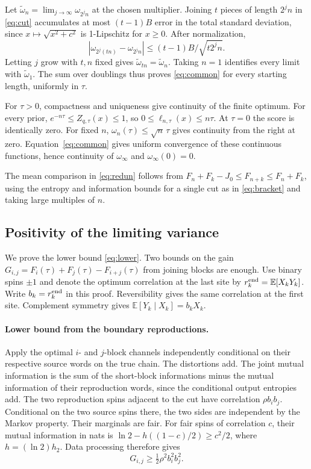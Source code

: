 \documentclass[11pt,letterpaper]{article}
\theoremstyle{definition}
\newcommand{\E}{\mathbb E}
\newcommand{\hx}{h_2}
\begin{document}
Let $\widetilde\omega_n=\lim_{j\to\infty}\omega_{2^jn}$ at the chosen multiplier. Joining $t$ pieces of length $2^jn$ in \eqref{eq:cut} accumulates at most $(t-1)B$ error in the total standard deviation, since $x\mapsto\sqrt{x^2+c^2}$ is 1-Lipschitz for $x\ge0$. After normalization,
\[
 |\omega_{2^j(tn)}-\omega_{2^jn}|\le (t-1)B/\sqrt{t2^jn}.
\]
Letting $j$ grow with $t,n$ fixed gives $\widetilde\omega_{tn}=\widetilde\omega_n$. Taking $n=1$ identifies every limit with $\widetilde\omega_1$. The sum over doublings thus proves \eqref{eq:common} for every starting length, uniformly in $\tau$.

For $\tau>0$, compactness and uniqueness give continuity of the finite optimum. For every prior, $e^{-n\tau}\le Z_{q,\tau}(x)\le1$, so $0\le\ell_{n,\tau}(x)\le n\tau$. At $\tau=0$ the score is identically zero. For fixed $n$, $\omega_n(\tau)\le\sqrt n\,\tau$ gives continuity from the right at zero. Equation~\eqref{eq:common} gives uniform convergence of these continuous functions, hence continuity of $\omega_\infty$ and $\omega_\infty(0)=0$.

The mean comparison in \eqref{eq:redun} follows from $F_n+F_k-J_0\le F_{n+k}\le F_n+F_k$, using the entropy and information bounds for a single cut as in \eqref{eq:bracket} and taking large multiples of $n$.

\subsection{Positivity of the limiting variance}\label{app:positive}
We prove the lower bound \eqref{eq:lower}.
Two bounds on the gain $G_{i,j}=F_i(\tau)+F_j(\tau)-F_{i+j}(\tau)$ from joining blocks are enough. Use binary spins $\pm1$ and denote the optimum correlation at the last site by $r_k^{\rm end}=\E[X_k Y_k]$. Write $b_k=r_k^{\rm end}$ in this proof. Reversibility gives the same correlation at the first site. Complement symmetry gives $\E[Y_k\mid X_k]=b_k X_k$.

\paragraph{Lower bound from the boundary reproductions.}
Apply the optimal $i$- and $j$-block channels independently conditional on their respective source words on the true chain. The distortions add. The joint mutual information is the sum of the short-block informations minus the mutual information of their reproduction words, since the conditional output entropies add. The two reproduction spins adjacent to the cut have correlation $\rho b_i b_j$. Conditional on the two source spins there, the two sides are independent by the Markov property. Their marginals are fair. For fair spins of correlation $c$, their mutual information in nats is $\ln2-h((1-c)/2)\ge c^2/2$, where $h=(\ln2)\hx$. Data processing therefore gives
\begin{equation}
 G_{i,j}\ge\tfrac12\rho^2 b_i^2 b_j^2.                             \label{eq:gainlo}
\end{equation}
\end{document}
